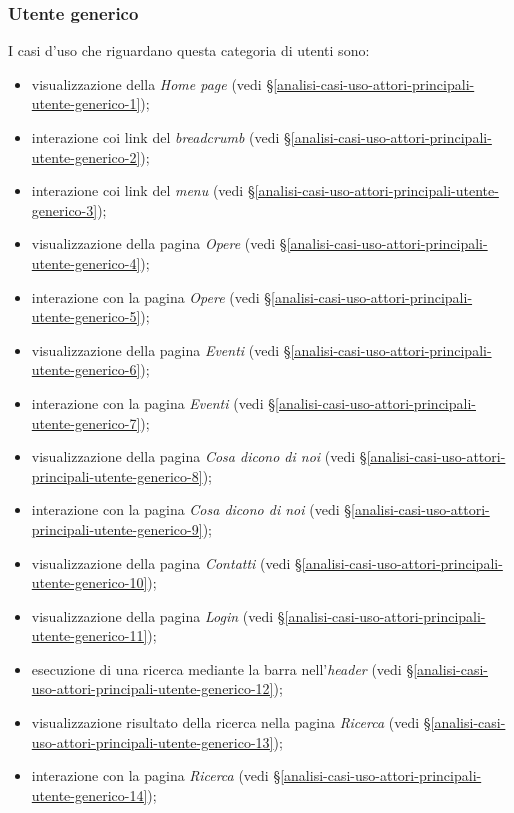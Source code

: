 \subsubsection{Utente generico}
\label{analisi-casi-uso-attori-principali-utente-generico}
I casi d'uso che riguardano questa categoria di utenti sono:
\begin{itemize}
	\item visualizzazione della \textit{Home page} (vedi §\ref{analisi-casi-uso-attori-principali-utente-generico-1});
	\item interazione coi link del \textit{breadcrumb} (vedi §\ref{analisi-casi-uso-attori-principali-utente-generico-2});
	\item interazione coi link del \textit{menu} (vedi §\ref{analisi-casi-uso-attori-principali-utente-generico-3});
	\item visualizzazione della pagina \textit{Opere} (vedi §\ref{analisi-casi-uso-attori-principali-utente-generico-4});
	\item interazione con la pagina \textit{Opere} (vedi §\ref{analisi-casi-uso-attori-principali-utente-generico-5});
	\item visualizzazione della pagina \textit{Eventi} (vedi §\ref{analisi-casi-uso-attori-principali-utente-generico-6});
	\item interazione con la pagina \textit{Eventi} (vedi §\ref{analisi-casi-uso-attori-principali-utente-generico-7});
	\item visualizzazione della pagina \textit{Cosa dicono di noi} (vedi §\ref{analisi-casi-uso-attori-principali-utente-generico-8});
	\item interazione con la pagina \textit{Cosa dicono di noi} (vedi §\ref{analisi-casi-uso-attori-principali-utente-generico-9});
	\item visualizzazione della pagina \textit{Contatti} (vedi §\ref{analisi-casi-uso-attori-principali-utente-generico-10});
	\item visualizzazione della pagina \textit{Login} (vedi §\ref{analisi-casi-uso-attori-principali-utente-generico-11});
	\item esecuzione di una ricerca mediante la barra nell'\textit{header} (vedi §\ref{analisi-casi-uso-attori-principali-utente-generico-12});
	\item visualizzazione risultato della ricerca nella pagina \textit{Ricerca} (vedi §\ref{analisi-casi-uso-attori-principali-utente-generico-13});
	\item interazione con la pagina \textit{Ricerca} (vedi §\ref{analisi-casi-uso-attori-principali-utente-generico-14});

\end{itemize}

